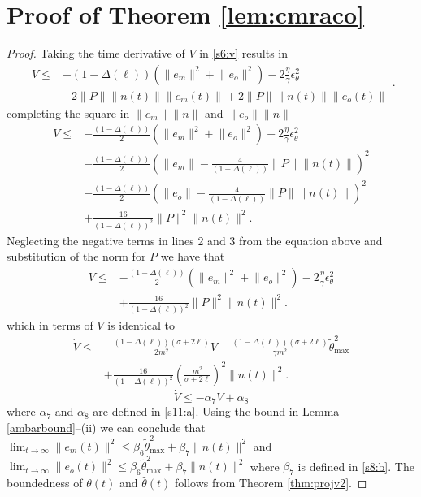 \documentclass[10pt,journal]{IEEEtran}
\theoremstyle{plain}%
\theoremstyle{definition}
\newcommand{\be}[0]{\begin{equation}}
\newcommand{\ee}[0]{\end{equation}}
\newcommand{\norms}[1]{\lVert#1\rVert}
\newcommand{\normB}[0]{\norms}
\let\norm=\normB
\begin{document}
\section{Proof of Theorem \ref{lem:cmraco}}\label{applemcmrac}
\begin{proof}
Taking the time derivative of $V$ in \eqref{s6:v} results in \be
\begin{split}\dot V \leq& -\left(1-\Delta(\ell ) \right)\left(\norm{e_m}^2+\norm{e_o}^2\right) -2\frac\eta\gamma\epsilon_\theta^2 \\&+2 \norm P \norm{n(t)}\norm{e_m(t)} +2 \norm P \norm{n(t)}\norm{e_o(t)}
\end{split}.\ee
completing the square in $\norm{e_m}\norm n$ and $\norm{e_o} \norm{n}$
\be\begin{split}
\dot V \leq &-\frac{\left(1-\Delta(\ell ) \right)}{2} \left(\norm{e_m}^2 +\norm{e_o}^2\right) -2\frac\eta\gamma\epsilon_\theta^2 \\ 
&-\frac{\left(1-\Delta(\ell ) \right)}{2} \left(\norm{e_m} -  \frac{4} {\left(1-\Delta(\ell ) \right)} \norm P \norm{n(t)}\right)^2 \\  
&-\frac{\left(1-\Delta(\ell ) \right)}{2} \left(\norm{e_o} -  \frac{4} {\left(1-\Delta(\ell ) \right)} \norm P \norm{n(t)}\right)^2 \\
& + \frac{16}{\left(1-\Delta(\ell ) \right)^2} \norm P^2 \norm{n(t)}^2 .
\end{split}
\ee
Neglecting the negative terms in lines 2 and 3 from the equation above and substitution of the norm for $P$ we have that
\be\begin{split}
\dot V \leq &-\frac{\left(1-\Delta(\ell ) \right)}{2} \left(\norm{e_m}^2 +\norm{e_o}^2\right) -2\frac\eta\gamma\epsilon_\theta^2 \\ 
& + \frac{16}{\left(1-\Delta(\ell ) \right)^2} \norm P^2 \norm{n(t)}^2 .
\end{split}
\ee
which in terms of $V$ is identical to
\be\begin{split}
\dot V \leq &-\frac{\left(1-\Delta(\ell ) \right)\left(\sigma+ 2\ell \right)}{2m^2}  V + \frac{\left(1-\Delta(\ell ) \right)\left(\sigma+ 2\ell \right)}{\gamma m^2} \tilde\theta_\text{max}^2 \\ 
& + \frac{16}{\left(1-\Delta(\ell ) \right)^2} \left(\frac{m^2}{\sigma+2 \ell}\right)^2 \norm{n(t)}^2 .
\end{split}\ee
\be
\dot V \leq -\alpha_7 V + \alpha_{8}
\ee
where $\alpha_7$ and $\alpha_{8}$ are defined in \eqref{s11:a}. Using the bound in Lemma \ref{ambarbound}--(ii) we can conclude that
${\lim_{t\rightarrow\infty}\norm {e_m(t)}^2 \leq \beta_6 \tilde\theta_\text{max}^2+\beta_7 \norm{n(t)}^2}$ and ${\lim_{t\rightarrow\infty}\norm {e_o(t)}^2 \leq \beta_6 \tilde\theta_\text{max}^2+\beta_7 \norm{n(t)}^2}$
where $\beta_7$ is defined in \eqref{s8:b}. The boundedness of $\theta(t)$ and $\hat\theta(t)$ follows from Theorem \ref{thm:projv2}.
\end{proof}
\end{document}
